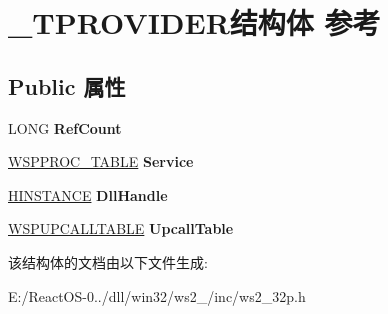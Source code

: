 \hypertarget{struct___t_p_r_o_v_i_d_e_r}{}\section{\+\_\+\+T\+P\+R\+O\+V\+I\+D\+E\+R结构体 参考}
\label{struct___t_p_r_o_v_i_d_e_r}
\subsection*{Public 属性}
\begin{DoxyCompactItemize}
\item 
\mbox{\label{struct___t_p_r_o_v_i_d_e_r_adf86b2b060e3c59e446bf0de9d075e08}} 
L\+O\+NG {\bfseries Ref\+Count}
\item 
\mbox{\label{struct___t_p_r_o_v_i_d_e_r_a306a071c4e0b29feb712850d9ceab227}} 
\hyperlink{struct___w_s_p_p_r_o_c___t_a_b_l_e}{W\+S\+P\+P\+R\+O\+C\+\_\+\+T\+A\+B\+LE} {\bfseries Service}
\item 
\mbox{\label{struct___t_p_r_o_v_i_d_e_r_af8453d67056c55d9df62e5d17e5591ff}} 
\hyperlink{interfacevoid}{H\+I\+N\+S\+T\+A\+N\+CE} {\bfseries Dll\+Handle}
\item 
\mbox{\label{struct___t_p_r_o_v_i_d_e_r_ab10238416f8f48f58ed6ef908dd2726f}} 
\hyperlink{struct___w_s_p_u_p_c_a_l_l_t_a_b_l_e}{W\+S\+P\+U\+P\+C\+A\+L\+L\+T\+A\+B\+LE} {\bfseries Upcall\+Table}
\end{DoxyCompactItemize}


该结构体的文档由以下文件生成\+:\begin{DoxyCompactItemize}
\item 
E\+:/\+React\+O\+S-\/0../dll/win32/ws2\+\_/inc/ws2\+\_\+32p.\+h\end{DoxyCompactItemize}

